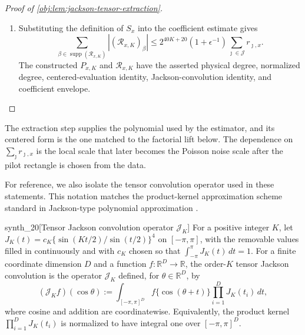 \documentclass[11pt]{article}
\begin{document}
\begin{proof}[Proof of \cref{obj:lem:jackson-tensor-extraction}]
\begin{enumerate}
\[\begin{aligned}
\prod_{\jmath\in\mathcal J}J_K(\tau_\jmath)\,d\tau .
\end{aligned}
\]
Thus
\[
P_{x,K}(b_x+r_x\odot\cos\vartheta)
=
\int_{[-\pi,\pi]^{\mathcal J}}
\bar f_\epsilon(b_x+r_x\odot\cos(\vartheta-\tau))
\prod_{\jmath\in\mathcal J}J_K(\tau_\jmath)\,d\tau.
\]
For each coordinate, \(J_K(-t)=J_K(t)\): both sine factors in its defining ratio change sign, and the ratio is raised to the fourth power. The coordinatewise substitution \(t=-\tau\) preserves \([-\pi,\pi]^{\mathcal J}\) and Lebesgue measure, and therefore changes \(\cos(\vartheta-\tau)\) to \(\cos(\vartheta+t)\) while leaving the product kernel unchanged. The last display is consequently the order-\(K\) tensor Jackson convolution in \cref{obj:def:jackson-kernel} of \(\bar f_\epsilon\) precomposed with the affine parametrization of \(Q_x\), evaluated at \(\vartheta\).

\item Substituting the definition of \(S_x\) into the coefficient estimate gives
\[
\sum_{\beta\in\operatorname{supp}(\mathcal R_{x,K})}
|(\mathcal R_{x,K})_\beta|
\le
2^{40K+20}
(1+\epsilon^{-1})
\sum_{\jmath\in\mathcal J}r_{\jmath,x}.
\]
The constructed \(P_{x,K}\) and \(\mathcal R_{x,K}\) have the asserted physical degree, normalized degree, centered-evaluation identity, Jackson-convolution identity, and coefficient envelope.
\end{enumerate}
\end{proof}

The extraction step supplies the polynomial used by the estimator, and its centered form is the one matched to the factorial lift below. The dependence on \(\sum_{\jmath}r_{\jmath,x}\) is the local scale that later becomes the Poisson noise scale after the pilot rectangle is chosen from the data.

For reference, we also isolate the tensor convolution operator used in these statements. This notation matches the product-kernel approximation scheme standard in Jackson-type polynomial approximation \citep{DeVore1993}.

\begin{definitionv}{synth_20}[Tensor Jackson convolution operator $\mathcal J_K$]
For a positive integer $K$, let $J_K(t)=c_K\{\sin(Kt/2)/\sin(t/2)\}^4$ on $[-\pi,\pi]$, with the removable values filled in continuously and with $c_K$ chosen so that $\int_{-\pi}^{\pi}J_K(t)\,dt=1$. For a finite coordinate dimension $D$ and a function $f:\mathbb R^D\to\mathbb R$, the order-$K$ tensor Jackson convolution is the operator $\mathcal J_K$ defined, for $\theta\in\mathbb R^D$, by \[ (\mathcal J_K f)(\cos\theta) := \int_{[-\pi,\pi]^D} f\{\cos(\theta+t)\}\prod_{i=1}^D J_K(t_i)\,dt, \] where cosine and addition are coordinatewise. Equivalently, the product kernel $\prod_{i=1}^D J_K(t_i)$ is normalized to have integral one over $[-\pi,\pi]^D$.
\end{definitionv}
\end{document}
